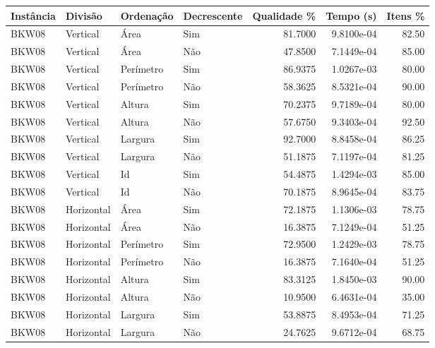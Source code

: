 \begin{tabular}{llllrrr}
    \hline
    Instância & Divisão     & Ordenação & Decrescente & Qualidade \% & Tempo (s)  & Itens \% \\
    \hline
    BKW08     & Vertical    & Área      & Sim         & 81.7000      & 9.8100e-04 & 82.50    \\
    BKW08     & Vertical    & Área      & Não         & 47.8500      & 7.1449e-04 & 85.00    \\
    BKW08     & Vertical    & Perímetro & Sim         & 86.9375      & 1.0267e-03 & 80.00    \\
    BKW08     & Vertical    & Perímetro & Não         & 58.3625      & 8.5321e-04 & 90.00    \\
    BKW08     & Vertical    & Altura    & Sim         & 70.2375      & 9.7189e-04 & 80.00    \\
    BKW08     & Vertical    & Altura    & Não         & 57.6750      & 9.3403e-04 & 92.50    \\
    BKW08     & Vertical    & Largura   & Sim         & 92.7000      & 8.8458e-04 & 86.25    \\
    BKW08     & Vertical    & Largura   & Não         & 51.1875      & 7.1197e-04 & 81.25    \\
    BKW08     & Vertical    & Id        & Sim         & 54.4875      & 1.4294e-03 & 85.00    \\
    BKW08     & Vertical    & Id        & Não         & 70.1875      & 8.9645e-04 & 83.75    \\
    BKW08     & Horizontal  & Área      & Sim         & 72.1875      & 1.1306e-03 & 78.75    \\
    BKW08     & Horizontal  & Área      & Não         & 16.3875      & 7.1249e-04 & 51.25    \\
    BKW08     & Horizontal  & Perímetro & Sim         & 72.9500      & 1.2429e-03 & 78.75    \\
    BKW08     & Horizontal  & Perímetro & Não         & 16.3875      & 7.1640e-04 & 51.25    \\
    BKW08     & Horizontal  & Altura    & Sim         & 83.3125      & 1.8450e-03 & 90.00    \\
    BKW08     & Horizontal  & Altura    & Não         & 10.9500      & 6.4631e-04 & 35.00    \\
    BKW08     & Horizontal  & Largura   & Sim         & 53.8875      & 8.4953e-04 & 71.25    \\
    BKW08     & Horizontal  & Largura   & Não         & 24.7625      & 9.6712e-04 & 68.75    \\

\end{tabular}
